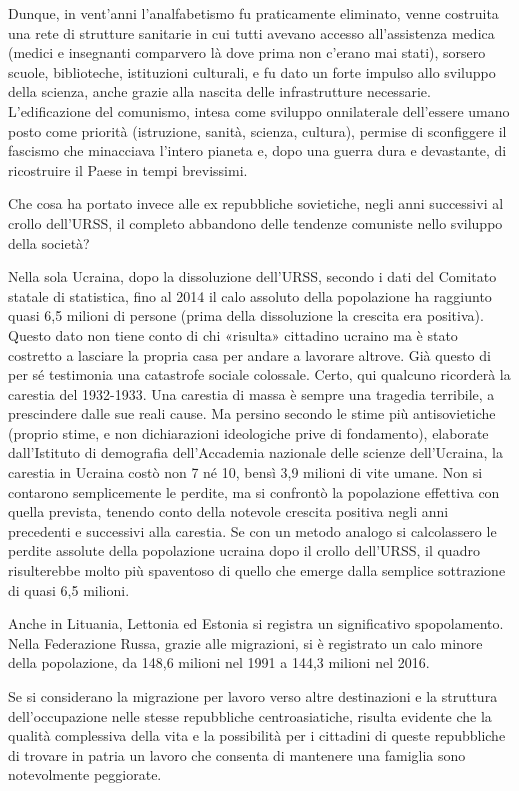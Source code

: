\documentclass[12pt,a4paper,openany]{book}
\begin{document}
Dunque, in vent'anni l'analfabetismo fu praticamente eliminato, venne costruita una rete di strutture sanitarie in cui tutti avevano accesso all'assistenza medica (medici e insegnanti comparvero là dove prima non c'erano mai stati), sorsero scuole, biblioteche, istituzioni culturali, e fu dato un forte impulso allo sviluppo della scienza, anche grazie alla nascita delle infrastrutture necessarie. L'edificazione del comunismo, intesa come sviluppo onnilaterale dell'essere umano posto come priorità (istruzione, sanità, scienza, cultura), permise di sconfiggere il fascismo che minacciava l'intero pianeta e, dopo una guerra dura e devastante, di ricostruire il Paese in tempi brevissimi.

Che cosa ha portato invece alle ex repubbliche sovietiche, negli anni successivi al crollo dell'URSS, il completo abbandono delle tendenze comuniste nello sviluppo della società?

Nella sola Ucraina, dopo la dissoluzione dell'URSS, secondo i dati del Comitato statale di statistica, fino al 2014 il calo assoluto della popolazione ha raggiunto quasi 6,5 milioni di persone (prima della dissoluzione la crescita era positiva). Questo dato non tiene conto di chi «risulta» cittadino ucraino ma è stato costretto a lasciare la propria casa per andare a lavorare altrove. Già questo di per sé testimonia una catastrofe sociale colossale. Certo, qui qualcuno ricorderà la carestia del 1932-1933. Una carestia di massa è sempre una tragedia terribile, a prescindere dalle sue reali cause. Ma persino secondo le stime più antisovietiche (proprio stime, e non dichiarazioni ideologiche prive di fondamento), elaborate dall'Istituto di demografia dell'Accademia nazionale delle scienze dell'Ucraina, la carestia in Ucraina costò non 7 né 10, bensì 3,9 milioni di vite umane. Non si contarono semplicemente le perdite, ma si confrontò la popolazione effettiva con quella prevista, tenendo conto della notevole crescita positiva negli anni precedenti e successivi alla carestia. Se con un metodo analogo si calcolassero le perdite assolute della popolazione ucraina dopo il crollo dell'URSS, il quadro risulterebbe molto più spaventoso di quello che emerge dalla semplice sottrazione di quasi 6,5 milioni.

Anche in Lituania, Lettonia ed Estonia si registra un significativo spopolamento. Nella Federazione Russa, grazie alle migrazioni, si è registrato un calo minore della popolazione, da 148,6 milioni nel 1991 a 144,3 milioni nel 2016.

Se si considerano la migrazione per lavoro verso altre destinazioni e la struttura dell'occupazione nelle stesse repubbliche centroasiatiche, risulta evidente che la qualità complessiva della vita e la possibilità per i cittadini di queste repubbliche di trovare in patria un lavoro che consenta di mantenere una famiglia sono notevolmente peggiorate.
\end{document}
